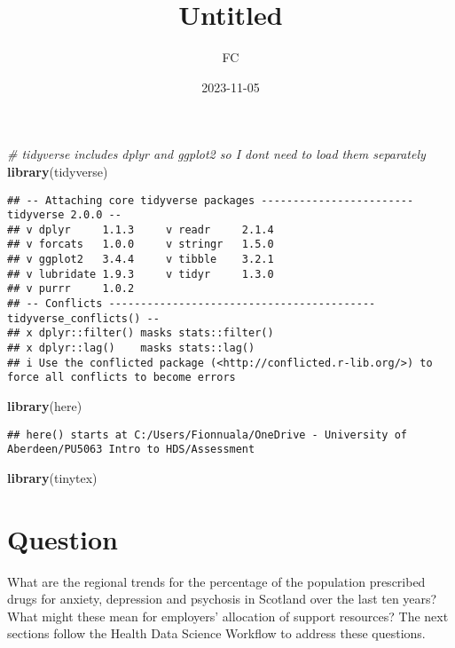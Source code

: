 \documentclass[
]{article}
\title{Untitled}
\author{FC}
\date{2023-11-05}
\newenvironment{Shaded}{\begin{snugshade}}{\end{snugshade}}
\newcommand{\CommentTok}[1]{\textcolor[rgb]{0.56,0.35,0.01}{\textit{#1}}}
\newcommand{\FunctionTok}[1]{\textcolor[rgb]{0.13,0.29,0.53}{\textbf{#1}}}
\newcommand{\NormalTok}[1]{#1}
\begin{document}
\maketitle

\begin{Shaded}
\begin{Highlighting}[]
\CommentTok{\# tidyverse includes dplyr and ggplot2 so I don\textquotesingle{}t need to load them separately}
\FunctionTok{library}\NormalTok{(tidyverse)}
\end{Highlighting}
\end{Shaded}

\begin{verbatim}
## -- Attaching core tidyverse packages ------------------------ tidyverse 2.0.0 --
## v dplyr     1.1.3     v readr     2.1.4
## v forcats   1.0.0     v stringr   1.5.0
## v ggplot2   3.4.4     v tibble    3.2.1
## v lubridate 1.9.3     v tidyr     1.3.0
## v purrr     1.0.2     
## -- Conflicts ------------------------------------------ tidyverse_conflicts() --
## x dplyr::filter() masks stats::filter()
## x dplyr::lag()    masks stats::lag()
## i Use the conflicted package (<http://conflicted.r-lib.org/>) to force all conflicts to become errors
\end{verbatim}

\begin{Shaded}
\begin{Highlighting}[]
\FunctionTok{library}\NormalTok{(here)}
\end{Highlighting}
\end{Shaded}

\begin{verbatim}
## here() starts at C:/Users/Fionnuala/OneDrive - University of Aberdeen/PU5063 Intro to HDS/Assessment
\end{verbatim}

\begin{Shaded}
\begin{Highlighting}[]
\FunctionTok{library}\NormalTok{(tinytex)}
\end{Highlighting}
\end{Shaded}

\hypertarget{question}{%
\section{Question}\label{question}}

What are the regional trends for the percentage of the population
prescribed drugs for anxiety, depression and psychosis in Scotland over
the last ten years? What might these mean for employers' allocation of
support resources? The next sections follow the Health Data Science
Workflow to address these questions.
\end{document}

